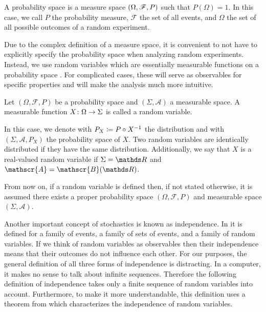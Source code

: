 \documentclass{stdlocal}
\begin{document}
    \begin{definition}
      A probability space is a measure space $\left( \Omega, \mathscr{F}, P \right)$ such that $P(\Omega)=1$.
      In this case, we call $P$ the probability measure, $\mathscr{F}$ the set of all events, and $\Omega$ the set of all possible outcomes of a random experiment.
    \end{definition}
    Due to the complex definition of a measure space, it is convenient to not have to explicitly specify the probability space when analyzing random experiments.
    Instead, we use random variables which are essentially measurable functions on a probability space \autocite[p.~194]{schmidt2009}.
    For complicated cases, these will serve as observables for specific properties and will make the analysis much more intuitive.

    \begin{definition}
      Let $(\Omega,\mathscr{F},P)$ be a probability space and $(\Sigma,\mathscr{A})$ a measurable space.
      A measurable function $X\colon\Omega\to\Sigma$ is called a random variable.

      In this case, we denote with $P_X\coloneqq P\circ{X}^{-1}$ the distribution and with $(\Sigma,\mathscr{A},P_X)$ the probability space of $X$.
      Two random variables are identically distributed if they have the same distribution.
      Additionally, we say that $X$ is a real-valued random variable if $\Sigma = \setReal$ and $\mathscr{A} = \mathscr{B}(\setReal)$.
    \end{definition}
    From now on, if a random variable is defined then, if not stated otherwise, it is assumed there exists a proper probability space $(\Omega,\mathscr{F},P)$ and measurable space $(\Sigma, \mathscr{A})$.

    Another important concept of stochastics is known as independence.
    In \textcite{schmidt2009} it is defined for a family of events, a family of sets of events, and a family of random variables.
    If we think of random variables as observables then their independence means that their outcomes do not influence each other.
    For our purposes, the general definition of all three forms of independence is distracting.
    In a computer, it makes no sense to talk about infinite sequences.
    Therefore the following definition of independence takes only a finite sequence of random variables into account.
    Furthermore, to make it more understandable, this definition uses a theorem from \textcite[p.~238]{schmidt2009} which characterizes the independence of random variables.
\end{document}
